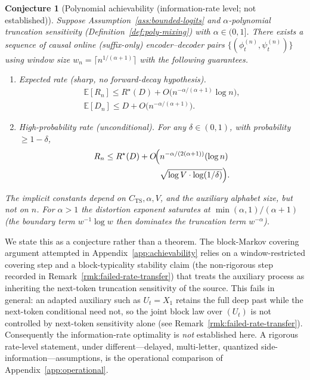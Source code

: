 \documentclass[11pt]{article}
\newcommand{\E}{\mathbb{E}}
\theoremstyle{plain}
\newtheorem{conjecture}[theorem]{Conjecture}
\theoremstyle{definition}
\theoremstyle{remark}
\begin{document}
\begin{conjecture}[Polynomial achievability (information-rate level; not established)]\label{thm:achievability}
Suppose Assumption~\ref{ass:bounded-logits} and
$\alpha$-polynomial truncation sensitivity
(Definition~\ref{def:poly-mixing}) with $\alpha \in (0, 1]$. There
exists a sequence of causal online (suffix-only) encoder--decoder
pairs $\{(\phi_t^{(n)}, \psi_t^{(n)})\}$ using window size
$w_n = \lceil n^{1/(\alpha+1)} \rceil$ with the following
guarantees.
\begin{enumerate}[label=(\alph*),leftmargin=*,itemsep=1pt,topsep=2pt]
\item \emph{Expected rate (sharp, no forward-decay hypothesis).}
\[
\begin{gathered}
\E[R_n] \leq R^\star(D) + O\!\bigl(n^{-\alpha/(\alpha+1)}\log n\bigr),\\
\E[D_n] \leq D + O\!\bigl(n^{-\alpha/(\alpha+1)}\bigr).
\end{gathered}
\]
\item \emph{High-probability rate (unconditional).} For any
$\delta \in (0,1)$, with probability $\geq 1-\delta$,
\[
\begin{split}
R_n \leq R^\star(D)
   + O\!\Bigl(&n^{-\alpha/(2(\alpha+1))}(\log n)\\
   &\sqrt{\log V \cdot \log(1/\delta)}\Bigr).
\end{split}
\]
\end{enumerate}
The implicit constants depend on $C_{\mathrm{TS}}, \alpha, V$, and
the auxiliary alphabet size, but not on $n$. For $\alpha > 1$ the
distortion exponent saturates at $\min(\alpha,1)/(\alpha+1)$ (the
boundary term $w^{-1}\log w$ then dominates the truncation term
$w^{-\alpha}$).
\end{conjecture}

We state this as a conjecture rather than a theorem. The block-Markov
covering argument attempted in Appendix~\ref{app:achievability} relies
on a window-restricted covering step and a block-typicality stability
claim (the non-rigorous step recorded in
Remark~\ref{rmk:failed-rate-transfer}) that treats the auxiliary
process as inheriting the next-token truncation sensitivity of the
source. This fails in general: an adapted auxiliary such as
$U_t = X_1$ retains the full deep past while the next-token
conditional need not, so the joint block law over $(U_t)$ is not
controlled by next-token sensitivity alone (see
Remark~\ref{rmk:failed-rate-transfer}). Consequently the
information-rate optimality is \emph{not} established here. A rigorous
rate-level statement, under different---delayed, multi-letter,
quantized side-information---assumptions, is the operational
comparison of Appendix~\ref{app:operational}.
\end{document}
